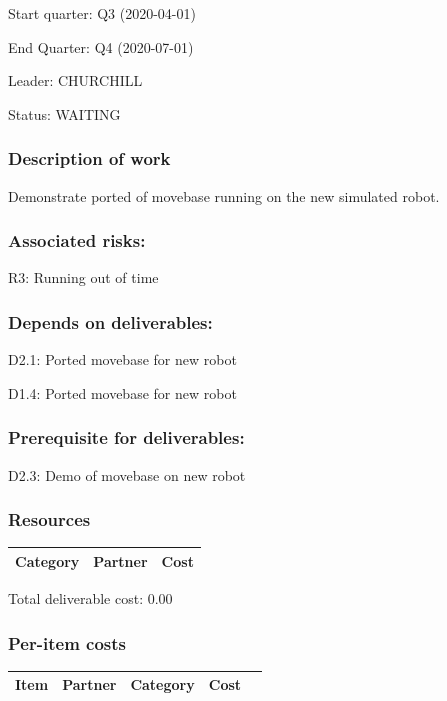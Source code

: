 \documentclass[english]{article}
\begin{document}
Start quarter: Q3 (2020-04-01) 
 
 End Quarter: Q4 (2020-07-01) 

 Leader: CHURCHILL

  Status: WAITING 

 \subsubsection*{Description of work}

Demonstrate ported of movebase running on the new simulated robot.

\subsubsection*{Associated risks:}

R3: Running out of time

\subsubsection*{Depends on deliverables:}

D2.1: Ported movebase for new robot

D1.4: Ported movebase for new robot



\subsubsection*{Prerequisite for deliverables:}

D2.3: Demo of movebase on new robot



\subsubsection*{Resources}

\begin{tabular}{ | l | l | r | }
\hline
 Category & Partner & Cost \\ 
 \hline
 \hline
 \end{tabular}

Total deliverable cost:  0.00

\subsubsection*{Per-item costs}

\begin{tabular}{ | l | c | c | r | c | }
\hline
 Item & Partner & Category & Cost \\ 
 \hline
 \hline
 \end{tabular}
\end{document}
